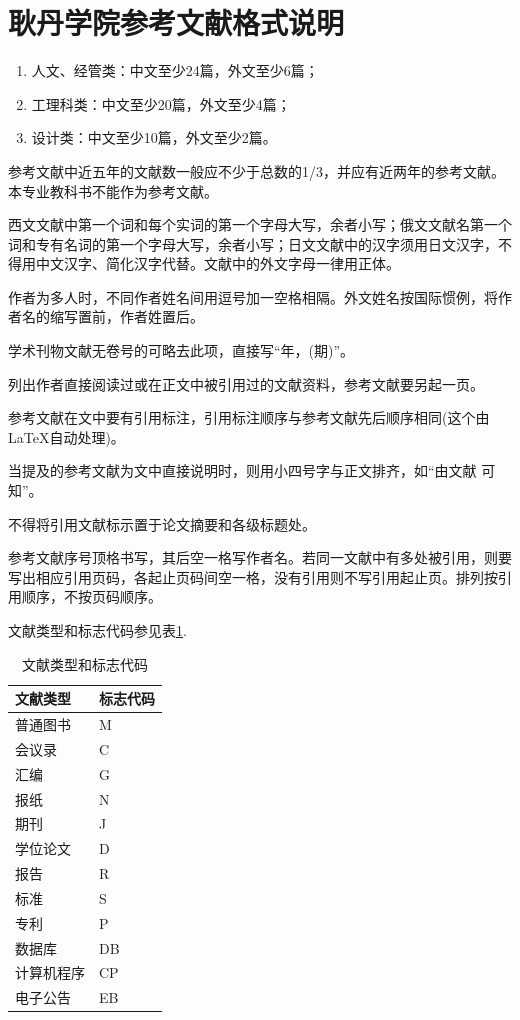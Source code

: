 
\section{耿丹学院参考文献格式说明}
\begin{demoenv}
\begin{enumerate}
   \item 人文、经管类：中文至少24篇，外文至少6篇；
   \item 工理科类：中文至少20篇，外文至少4篇；
   \item 设计类：中文至少10篇，外文至少2篇。
\end{enumerate}

参考文献中近五年的文献数一般应不少于总数的1/3，并应有近两年的参考文献。本专业教科书不能作为参考文献。

西文文献中第一个词和每个实词的第一个字母大写，余者小写；俄文文献名第一个词和专有名词的第一个字母大写，余者小写；日文文献中的汉字须用日文汉字，不得用中文汉字、简化汉字代替。文献中的外文字母一律用正体。

作者为多人时，不同作者姓名间用逗号加一空格相隔。外文姓名按国际惯例，将作者名的缩写置前，作者姓置后。

学术刊物文献无卷号的可略去此项，直接写``年，(期)''。

列出作者直接阅读过或在正文中被引用过的文献资料，参考文献要另起一页。

参考文献在文中要有引用标注，引用标注顺序与参考文献先后顺序相同(这个由\LaTeX 自动处理)。

当提及的参考文献为文中直接说明时，则用小四号字与正文排齐，如``由文献\citep{knuth1984texbook,lamport1994latex,mittelbach2004latex,gbt77142015,wang2007latex} 可知''。

不得将引用文献标示置于论文摘要和各级标题处。

参考文献序号顶格书写，其后空一格写作者名。若同一文献中有多处被引用，则要写出相应引用页码，各起止页码间空一格，没有引用则不写引用起止页。排列按引用顺序，不按页码顺序。
\end{demoenv}

 文献类型和标志代码参见表\ref{tab:littype}.
 \begin{table}[htbp]
 \centering
 \caption{文献类型和标志代码 \label{tab:littype}}
 \begin{tabular}{ll}
 \toprule
 文献类型 & 标志代码 \\
 \midrule
 普通图书 & M \\
 会议录 & C \\
 汇编 & G \\
 报纸 & N \\
 期刊 & J \\
 学位论文 & D \\
 报告 & R \\
 标准 & S \\
 专利 & P \\
 数据库 & DB \\
 计算机程序 & CP \\
 电子公告 & EB \\
 \bottomrule
 \end{tabular}
 \end{table}
 
